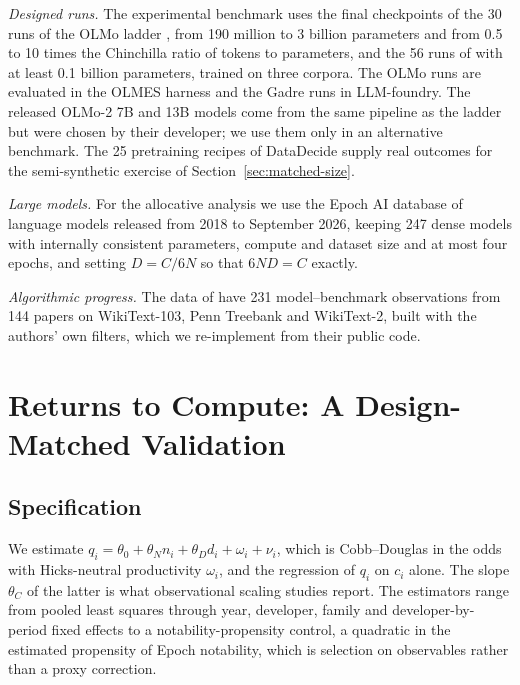 \documentclass[AER,finalmode]{AEA}
\theoremstyle{definition}
\theoremstyle{remark}
\begin{document}
\textit{Designed runs.} The experimental benchmark uses the final checkpoints of the 30 runs of the OLMo ladder
\citep{bhagia2024establishing}, from 190 million to 3 billion parameters and from 0.5 to 10 times the Chinchilla ratio of
tokens to parameters, and the 56 runs of \citet{gadre2024language} with at least 0.1 billion parameters, trained on
three corpora. The OLMo runs are evaluated in the OLMES harness and the Gadre runs in LLM-foundry. The released OLMo-2 7B
and 13B models \citep{teamolmo2024olmo} come from the same pipeline as the ladder but were chosen by their developer; we
use them only in an alternative benchmark. The 25 pretraining recipes of DataDecide \citep{magnusson2025datadecide}
supply real outcomes for the semi-synthetic exercise of Section~\ref{sec:matched-size}.

\textit{Large models.} For the allocative analysis we use the Epoch AI database of language models released from 2018
to September 2026, keeping 247 dense models with internally consistent parameters, compute and dataset size and at
most four epochs, and setting $D=C/6N$ so that $6ND=C$ exactly.

\textit{Algorithmic progress.} The data of \citet{ho2024algorithmic} have 231 model--benchmark observations from 144
papers on WikiText-103, Penn Treebank and WikiText-2, built with the authors' own filters, which we re-implement from
their public code.

\section{Returns to Compute: A Design-Matched Validation}\label{sec:matched}

\subsection{Specification}

We estimate $q_i=\theta_0+\theta_Nn_i+\theta_Dd_i+\omega_i+\nu_i$, which is Cobb--Douglas in the odds with
Hicks-neutral productivity $\omega_i$, and the regression of $q_i$ on $c_i$ alone. The slope $\theta_C$ of the latter
is what observational scaling studies report. The estimators range from pooled least squares through year, developer,
family and developer-by-period fixed effects to a notability-propensity control, a quadratic in the estimated
propensity of Epoch notability, which is selection on observables rather than a proxy correction.
\end{document}
